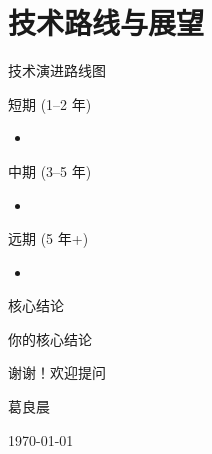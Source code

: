 \documentclass[aspectratio=169, 8pt, UTF8]{ctexbeamer}
\begin{document}
\section{技术路线与展望}

\begin{frame}{技术演进路线图}
  \begin{block}{短期 (1--2 年)}
    \begin{itemize}
      \item
    \end{itemize}
  \end{block}

  \begin{exampleblock}{中期 (3--5 年)}
    \begin{itemize}
      \item
    \end{itemize}
  \end{exampleblock}

  \begin{alertblock}{远期 (5 年+)}
    \begin{itemize}
      \item
    \end{itemize}
  \end{alertblock}
\end{frame}

\begin{frame}{核心结论}
  \begin{center}
    {\large 你的核心结论}
  \end{center}
\end{frame}

\begin{frame}[plain]
  \centering
  \vfill
  {\huge\color{ieeeBlue} 谢谢！欢迎提问}

  \vspace{20pt}
  {\large 葛良晨}

  \vspace{8pt}
  {\large \today}
  \vfill
\end{frame}
\end{document}
